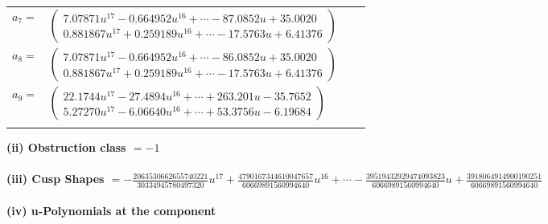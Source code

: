 \documentclass[1p]{elsarticle_modified}
\theoremstyle{definition}
\begin{document}
\begin{tabular}{m{7pt} m{180pt} m{7pt} m{180pt} }
\flushright $a_{7}=$&$\begin{pmatrix}7.07871 u^{17}-0.664952 u^{16}+\cdots-87.0852 u+35.0020\\0.881867 u^{17}+0.259189 u^{16}+\cdots-17.5763 u+6.41376\end{pmatrix}$ \\
\flushright $a_{8}=$&$\begin{pmatrix}7.07871 u^{17}-0.664952 u^{16}+\cdots-86.0852 u+35.0020\\0.881867 u^{17}+0.259189 u^{16}+\cdots-17.5763 u+6.41376\end{pmatrix}$ \\
\flushright $a_{9}=$&$\begin{pmatrix}22.1744 u^{17}-27.4894 u^{16}+\cdots+263.201 u-35.7652\\5.27270 u^{17}-6.06640 u^{16}+\cdots+53.3756 u-6.19684\end{pmatrix}$\\&\end{tabular}
\flushleft \textbf{(ii) Obstruction class $= -1$}\\~\\
\flushleft \textbf{(iii) Cusp Shapes $= -\frac{2063530662655740221}{30334945780497320} u^{17}+\frac{4790167344610047657}{60669891560994640} u^{16}+\cdots-\frac{39519432929474093823}{60669891560994640} u+\frac{3918064914900190251}{60669891560994640}$}\\~\\
\newpage\renewcommand{\arraystretch}{1}
\flushleft \textbf{(iv) u-Polynomials at the component}\newline \\
\end{document}
